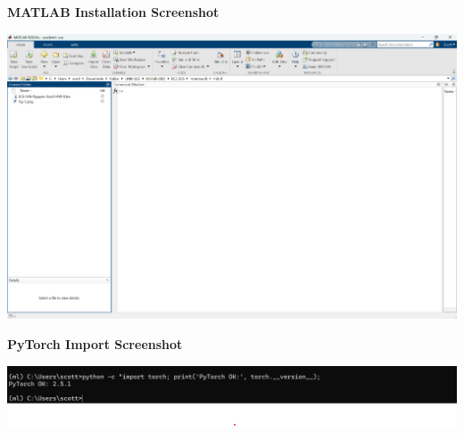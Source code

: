 \documentclass[11pt]{article}
\begin{document}
	
	\textbf{MATLAB Installation Screenshot}
	\par
	\includegraphics[width=\textwidth,height=0.44\textheight,keepaspectratio]{fig-1.png}
	
	\vspace{0.6em}
	
	\textbf{PyTorch Import Screenshot}
	\par
	\includegraphics[width=\textwidth,height=0.44\textheight,keepaspectratio]{fig-2.png}
	
\end{document}
